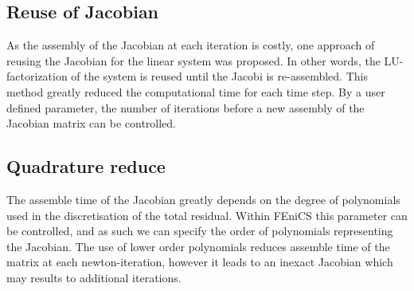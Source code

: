 \subsection{Reuse of Jacobian}
As the assembly of the Jacobian at each iteration is costly, one approach of reusing the Jacobian for the linear system was proposed. In other words, the LU-factorization of the system is reused until the Jacobi is re-assembled. This method greatly reduced the computational time for each time step. By a user defined parameter, the number of iterations before a new assembly of the Jacobian matrix can be controlled. 

\subsection{Quadrature reduce}
The assemble time of the Jacobian greatly depends on the degree of polynomials used in the discretisation of the total residual. Within FEniCS this parameter can be controlled, and as such we can specify the order of polynomials representing the Jacobian. The use of lower order polynomials reduces assemble time of the matrix at each newton-iteration, however it leads to an inexact Jacobian which may results to additional iterations. 


 




  